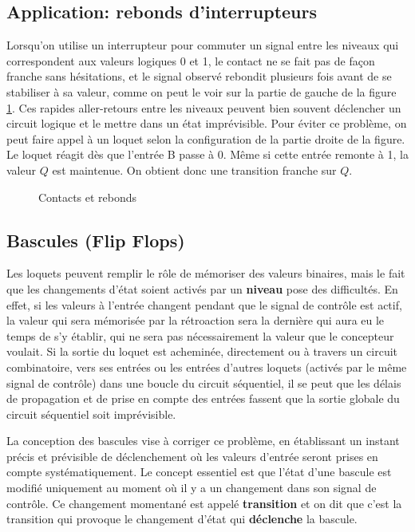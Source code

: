 \documentclass[11pt]{article}
\begin{document}
\subsection{Application: rebonds d'interrupteurs}
\label{sec:org7a83b99}

Lorsqu'on utilise un interrupteur pour commuter un signal entre les
niveaux qui correspondent aux valeurs logiques 0 et 1, le contact ne
se fait pas de façon franche sans hésitations, et le signal observé
rebondit plusieurs fois avant de se stabiliser à sa valeur, comme on
peut le voir sur la partie de gauche de la figure \ref{fig:org9d03bc7}. Ces
rapides aller-retours entre les niveaux peuvent bien souvent
déclencher un circuit logique et le mettre dans un état
imprévisible. Pour éviter ce problème, on peut faire appel à un loquet
selon la configuration de la partie droite de la figure. Le loquet
réagit dès que l'entrée B passe à 0. Même si cette entrée remonte à 1,
la valeur \(Q\) est maintenue. On obtient donc une transition franche sur
\(Q\).

\begin{figure}[htbp]
\centering

\caption{\label{fig:org9d03bc7}Contacts et rebonds}
\end{figure}

\subsection{Bascules (Flip Flops)}
\label{sec:orgf9da028}

Les loquets peuvent remplir le rôle de mémoriser des valeurs binaires,
mais le fait que les changements d'état soient activés par un \textbf{niveau}
pose des difficultés. En effet, si les valeurs à l'entrée changent
pendant que le signal de contrôle est actif, la valeur qui sera
mémorisée par la rétroaction sera la dernière qui aura eu le temps de
s'y établir, qui ne sera pas nécessairement la valeur que le
concepteur voulait. Si la sortie du loquet est acheminée, directement
ou à travers un circuit combinatoire, vers ses entrées ou les entrées
d'autres loquets (activés par le même signal de contrôle) dans une
boucle du circuit séquentiel, il se peut que les délais de propagation
et de prise en compte des entrées fassent que la sortie globale du
circuit séquentiel soit imprévisible.

La conception des bascules vise à corriger ce problème, en établissant
un instant précis et prévisible de déclenchement où les valeurs
d'entrée seront prises en compte systématiquement. Le concept
essentiel est que l'état d'une bascule est modifié uniquement au
moment où il y a un changement dans son signal de contrôle. Ce
changement momentané est appelé \textbf{transition} et on dit que c'est la
transition qui provoque le changement d'état qui \textbf{déclenche} la
bascule.
\end{document}
